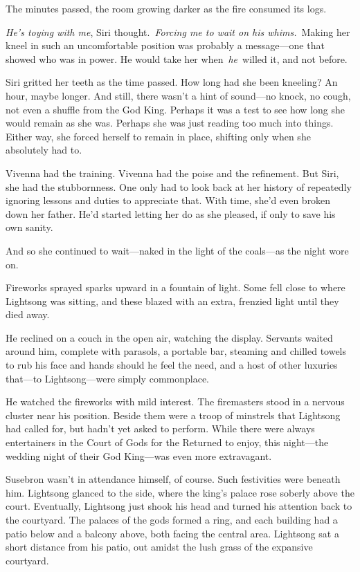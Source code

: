 The minutes passed, the room growing darker as the fire consumed its logs.

\textit{He’s toying with me}, Siri thought.~\textit{Forcing me to wait on his whims.}~Making her kneel in such an uncomfortable position was probably a message—one that showed who was in power. He would take her when~\textit{he}~willed it, and not before.

Siri gritted her teeth as the time passed. How long had she been kneeling? An hour, maybe longer. And still, there wasn’t a hint of sound—no knock, no cough, not even a shuffle from the God King. Perhaps it was a test to see how long she would remain as she was. Perhaps she was just reading too much into things. Either way, she forced herself to remain in place, shifting only when she absolutely had to.

Vivenna had the training. Vivenna had the poise and the refinement. But Siri, she had the stubbornness. One only had to look back at her history of repeatedly ignoring lessons and duties to appreciate that. With time, she’d even broken down her father. He’d started letting her do as she pleased, if only to save his own sanity.

And so she continued to wait—naked in the light of the coals—as the night wore on.

\orn

Fireworks sprayed sparks upward in a fountain of light. Some fell close to where Lightsong was sitting, and these blazed with an extra, frenzied light until they died away.

He reclined on a couch in the open air, watching the display. Servants waited around him, complete with parasols, a portable bar, steaming and chilled towels to rub his face and hands should he feel the need, and a host of other luxuries that—to Lightsong—were simply commonplace.

He watched the fireworks with mild interest. The firemasters stood in a nervous cluster near his position. Beside them were a troop of minstrels that Lightsong had called for, but hadn’t yet asked to perform. While there were always entertainers in the Court of Gods for the Returned to enjoy, this night—the wedding night of their God King—was even more extravagant.

Susebron wasn’t in attendance himself, of course. Such festivities were beneath him. Lightsong glanced to the side, where the king’s palace rose soberly above the court. Eventually, Lightsong just shook his head and turned his attention back to the courtyard. The palaces of the gods formed a ring, and each building had a patio below and a balcony above, both facing the central area. Lightsong sat a short distance from his patio, out amidst the lush grass of the expansive courtyard.

